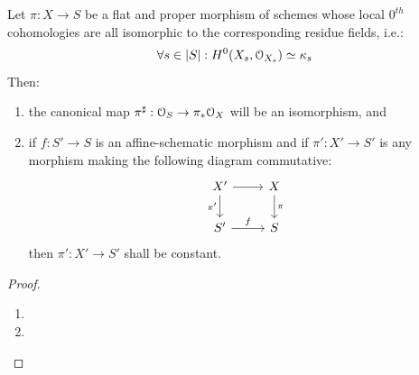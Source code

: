                \begin{theorem} \label{theorem: rigidity_theorem_1}
                    Let $\pi: X \to S$ be a flat and proper morphism of schemes whose local $0^{th}$ cohomologies are all isomorphic to the corresponding residue fields, i.e.:
                        $$\forall s \in |S|: H^0(X_s, \mathcal{O}_{X_s}) \simeq \kappa_s$$
                    Then:
                        \begin{enumerate}
                            \item the canonical map $\pi^{\sharp}: \mathcal{O}_S \to \pi_*\mathcal{O}_X$ will be an isomorphism, and
                            \item if $f: S' \to S$ is an affine-schematic morphism and if $\pi': X' \to S'$ is any morphism making the following diagram commutative:
                                $$
                                    \begin{tikzcd}
                                    	{X'} & X \\
                                    	{S'} & S
                                    	\arrow["f", from=2-1, to=2-2]
                                    	\arrow["\pi", from=1-2, to=2-2]
                                    	\arrow["{\pi'}"', from=1-1, to=2-1]
                                    	\arrow[from=1-1, to=1-2]
                                    \end{tikzcd}
                                $$
                            then $\pi': X' \to S'$ shall be constant.
                        \end{enumerate}
                \end{theorem}
                    \begin{proof}
                        \noindent
                        \begin{enumerate}
                            \item 
                            \item 
                        \end{enumerate}             
                    \end{proof}
